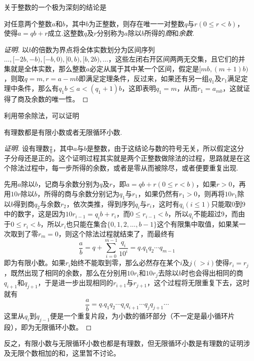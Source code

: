 关于整数的一个极为深刻的结论是
\begin{theorem}[带余除法]
  对任意两个整数$a$和$b$，其中$b$为正整数，则存在唯一一对整数$q$与$r(0\leqslant r < b)$，使得$a=qb+r$成立.这整数$q$及$r$分别称为$a$除以$b$所得的\emph{商}和\emph{余数}.
\end{theorem}

\begin{proof}[证明]
  以$b$的倍数为界点将全体实数划分为区间序列$\ldots,[-2b,-b),[-b,0),[0,b),[b,2b),\ldots$，这些左闭右开区间两两无交集，且它们的并集就是全体实数，那么整数$a$必定从属于其中某一个区间，假定是$[mb,(m+1)b)$，则取$q=m,r=a-mb$即满足定理条件，反过来，如果还有另一组$q_1$及$r_1$满足定理中条件，那么有$q_1b \leqslant a < (q_1+1)b$，这即表明$q_1=m$，从而$r_1=a_{mb}$，这就证得了商及余数的唯一性。
\end{proof}

利用带余除法，可以证明
\begin{theorem}
  有理数都是有限小数或者无限循环小数.
\end{theorem}

\begin{proof}[证明]
  设有理数$\frac{a}{b}$，其中$a$与$b$是整数，由于这结论与数的符号无关，所以假定这分子分母还是正的。这个证明过程其实就是两个正整数做除法的过程，思路就是在这个除法过程中，每一步所得的余数，或者是零从而被除尽，或者便要重复出现.

  先用$a$除以$b$，记商与余数分别为$q$及$r$，即$a=qb+r(0\leqslant r < b)$，如果$r>0$，再用$10r$除以$b$，所得的商与余数分别记为$q_1$与$r_1$，如果仍然有$r_1>0$，则再将$10r_1$除以$b$得到商$q_2$与余数$r_2$，依次类推，得到序列$q_i$与$r_i$，这时有$q_i(i \leqslant 1)$只能取$0$到$9$中的数字，这是因为$10r_{i-1}=q_ib+r_i$，而$0 \leqslant r_{i-1} < b$，所以$q_i$不能超过9，而由于$0 \leqslant r_i < b$，所以$r_i$也只能在集合$\{0,1,2,\ldots,b-1\}$这个有限集中取值，如果某一次取到了零$r_m=0$，则这个除法过程就结束了，而最终有
  \[ \frac{a}{b} = q + \sum_{i=0}^{m-1}\frac{q_i}{10^i} = q.q_1q_2\cdots q_{m-1} \]
  即为有限小数。如果$r_i$始终不能取到零，那么必然存在某个$i$及$j(> i)$使得$r_i=r_j$，既然出现了相同的余数，那么在分别用$10r_i$和$10r_j$去除以$b$时也会得出相同的商$q_{i+1}$和$q_{j+1}$，于是进一步出现相同的$r_{i+1}$与$r_{j+1}$，这个过程将无限重复下去，这时就有
  \[ \frac{a}{b} = q.q_1q_2 \cdots q_iq_{i+1} \cdots q_jq_{j+1} \cdots \]
  这里从$q_i$到$q_{j-1}$便是一个重复片段，为小数的循环部分（不一定是最小循环片段），即为无限循环小数。
\end{proof}

反之，有限小数与无限循环小数也都是有理数，但无限循环小数是有理数的证明涉及无限个数相加的和，这里暂不讨论。

